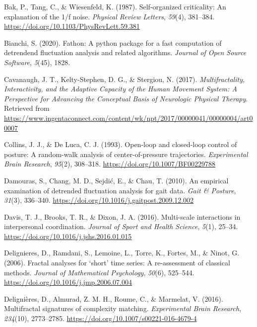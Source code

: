 \documentclass[
  man]{apa6}
\newlength{\cslhangindent}
\newlength{\cslentryspacingunit} %
\newenvironment{CSLReferences}[2] %
 {%
  \setlength{\parindent}{0pt}
  \ifodd #1
  \let\oldpar\par
  \def\par{\hangindent=\cslhangindent\oldpar}
  \fi
  \setlength{\parskip}{#2\cslentryspacingunit}
 }%
 {}
\begin{document}
\hypertarget{refs}{}
\begin{CSLReferences}{1}{0}
\leavevmode{}%
Bak, P., Tang, C., \& Wiesenfeld, K. (1987). Self-organized criticality: {An} explanation of the 1/f noise. \emph{Physical Review Letters}, \emph{59}(4), 381--384. \url{https://doi.org/10.1103/PhysRevLett.59.381}

\leavevmode{}%
Bianchi, S. (2020). Fathon: A python package for a fast computation of detrendend fluctuation analysis and related algorithms. \emph{Journal of Open Source Software}, \emph{5}(45), 1828.

\leavevmode{}%
Cavanaugh, J. T., Kelty-Stephen, D. G., \& Stergiou, N. (2017). \emph{Multifractality, Interactivity, and the Adaptive Capacity of the Human Movement System: A Perspective for Advancing the Conceptual Basis of Neurologic Physical Therapy}. Retrieved from \url{https://www.ingentaconnect.com/content/wk/npt/2017/00000041/00000004/art00007}

\leavevmode{}%
Collins, J. J., \& De Luca, C. J. (1993). Open-loop and closed-loop control of posture: A random-walk analysis of center-of-pressure trajectories. \emph{Experimental Brain Research}, \emph{95}(2), 308--318. \url{https://doi.org/10.1007/BF00229788}

\leavevmode{}%
Damouras, S., Chang, M. D., Sejdić, E., \& Chau, T. (2010). An empirical examination of detrended fluctuation analysis for gait data. \emph{Gait \& Posture}, \emph{31}(3), 336--340. \url{https://doi.org/10.1016/j.gaitpost.2009.12.002}

\leavevmode{}%
Davis, T. J., Brooks, T. R., \& Dixon, J. A. (2016). Multi-scale interactions in interpersonal coordination. \emph{Journal of Sport and Health Science}, \emph{5}(1), 25--34. \url{https://doi.org/10.1016/j.jshs.2016.01.015}

\leavevmode{}%
Delignieres, D., Ramdani, S., Lemoine, L., Torre, K., Fortes, M., \& Ninot, G. (2006). Fractal analyses for {`}short{'} time series: A re-assessment of classical methods. \emph{Journal of Mathematical Psychology}, \emph{50}(6), 525--544. \url{https://doi.org/10.1016/j.jmp.2006.07.004}

\leavevmode{}%
Delignières, D., Almurad, Z. M. H., Roume, C., \& Marmelat, V. (2016). Multifractal signatures of complexity matching. \emph{Experimental Brain Research}, \emph{234}(10), 2773--2785. \url{https://doi.org/10.1007/s00221-016-4679-4}


\end{CSLReferences}
\end{document}
